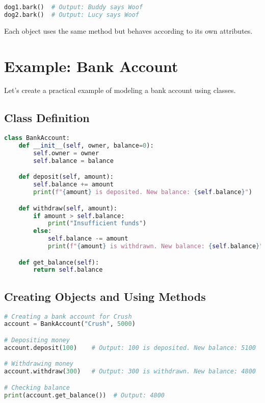 \begin{lstlisting}[language=Python]
dog1.bark()  # Output: Buddy says Woof
dog2.bark()  # Output: Lucy says Woof
\end{lstlisting}

Each object uses the same method but behaves according to its own attributes.

\section{Example: Bank Account}

Let's create a practical example of modeling a bank account using classes.

\subsection{Class Definition}

\begin{lstlisting}[language=Python]
class BankAccount:
    def __init__(self, owner, balance=0):
        self.owner = owner
        self.balance = balance

    def deposit(self, amount):
        self.balance += amount
        print(f"{amount} is deposited. New balance: {self.balance}")

    def withdraw(self, amount):
        if amount > self.balance:
            print("Insufficient funds")
        else:
            self.balance -= amount
            print(f"{amount} is withdrawn. New balance: {self.balance}")

    def get_balance(self):
        return self.balance
\end{lstlisting}

\subsection{Creating Objects and Using Methods}

\begin{lstlisting}[language=Python]
# Creating a bank account for Crush
account = BankAccount("Crush", 5000)

# Depositing money
account.deposit(100)    # Output: 100 is deposited. New balance: 5100

# Withdrawing money
account.withdraw(300)   # Output: 300 is withdrawn. New balance: 4800

# Checking balance
print(account.get_balance())  # Output: 4800
\end{lstlisting}

